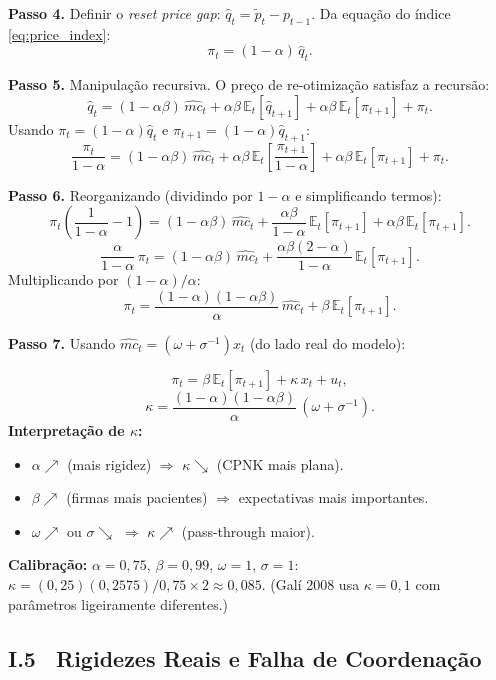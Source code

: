 \documentclass[12pt, a4paper]{article}
\newcommand{\E}{\mathbb{E}}
\begin{document}
\textbf{Passo 4.} Definir o \emph{reset price gap}: $\hat{q}_t = \tilde{p}_t - p_{t-1}$.
Da equação do índice \eqref{eq:price_index}:
\[
\pi_t = (1-\alpha)\,\hat{q}_t.
\]

\textbf{Passo 5.} Manipulação recursiva. O preço de re-otimização satisfaz a recursão:
\[
\hat{q}_t = (1-\alpha\beta)\,\hat{mc}_t + \alpha\beta\,\E_t[\hat{q}_{t+1}]
  + \alpha\beta\,\E_t[\pi_{t+1}] + \pi_t.
\]
Usando $\pi_t = (1-\alpha)\hat{q}_t$ e $\pi_{t+1} = (1-\alpha)\hat{q}_{t+1}$:
\[
\frac{\pi_t}{1-\alpha} = (1-\alpha\beta)\,\hat{mc}_t
  + \alpha\beta\,\E_t\!\left[\frac{\pi_{t+1}}{1-\alpha}\right]
  + \alpha\beta\,\E_t[\pi_{t+1}] + \pi_t.
\]

\textbf{Passo 6.} Reorganizando (dividindo por $1-\alpha$ e simplificando termos):
\[
\pi_t\!\left(\frac{1}{1-\alpha} - 1\right) = (1-\alpha\beta)\,\hat{mc}_t
  + \frac{\alpha\beta}{1-\alpha}\,\E_t[\pi_{t+1}]
  + \alpha\beta\,\E_t[\pi_{t+1}].
\]
\[
\frac{\alpha}{1-\alpha}\,\pi_t = (1-\alpha\beta)\,\hat{mc}_t
  + \frac{\alpha\beta(2-\alpha)}{1-\alpha}\,\E_t[\pi_{t+1}].
\]
Multiplicando por $(1-\alpha)/\alpha$:
\[
\pi_t = \frac{(1-\alpha)(1-\alpha\beta)}{\alpha}\,\hat{mc}_t + \beta\,\E_t[\pi_{t+1}].
\]

\textbf{Passo 7.} Usando $\hat{mc}_t = (\omega + \sigma^{-1})x_t$ (do lado real do modelo):

\begin{formulabox}[title={Curva de Phillips NK (CPNK)}]
\[
\boxed{\pi_t = \beta\,\E_t[\pi_{t+1}] + \kappa\,x_t + u_t,}
\]
\[
\kappa = \frac{(1-\alpha)(1-\alpha\beta)}{\alpha}\,(\omega + \sigma^{-1}).
\]
\textbf{Interpretação de $\kappa$:}
\begin{itemize}[leftmargin=1.5em, itemsep=2pt]
  \item $\alpha\nearrow$ (mais rigidez) $\Rightarrow$ $\kappa\searrow$ (CPNK mais plana).
  \item $\beta\nearrow$ (firmas mais pacientes) $\Rightarrow$ expectativas mais importantes.
  \item $\omega\nearrow$ ou $\sigma\searrow$ $\Rightarrow$ $\kappa\nearrow$ (pass-through maior).
\end{itemize}
\textbf{Calibração:} $\alpha=0{,}75$, $\beta=0{,}99$, $\omega=1$, $\sigma=1$:
$\kappa = (0{,}25)(0{,}2575)/0{,}75 \times 2 \approx 0{,}085$.
(Galí 2008 usa $\kappa=0{,}1$ com parâmetros ligeiramente diferentes.)
\end{formulabox}

\subsection*{I.5 \ Rigidezes Reais e Falha de Coordenação}
\end{document}
